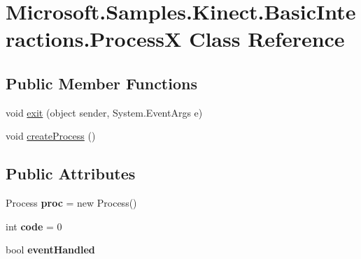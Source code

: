 \hypertarget{class_microsoft_1_1_samples_1_1_kinect_1_1_basic_interactions_1_1_process_x}{\section{Microsoft.\-Samples.\-Kinect.\-Basic\-Interactions.\-Process\-X Class Reference}
\label{class_microsoft_1_1_samples_1_1_kinect_1_1_basic_interactions_1_1_process_x}
}
\subsection*{Public Member Functions}
\begin{DoxyCompactItemize}
\item 
void \hyperlink{class_microsoft_1_1_samples_1_1_kinect_1_1_basic_interactions_1_1_process_x_afa1fa49c7b1ed3d773ddf8d4c58a8d80}{exit} (object sender, System.\-Event\-Args e)
\item 
void \hyperlink{class_microsoft_1_1_samples_1_1_kinect_1_1_basic_interactions_1_1_process_x_a1cda77c8cd9fc13f1d537dc61bca8fe6}{create\-Process} ()
\end{DoxyCompactItemize}
\subsection*{Public Attributes}
\begin{DoxyCompactItemize}
\item 
\hypertarget{class_microsoft_1_1_samples_1_1_kinect_1_1_basic_interactions_1_1_process_x_a4009d8cbd4592de6fa4512ef00115557}{Process {\bfseries proc} = new Process()}\label{class_microsoft_1_1_samples_1_1_kinect_1_1_basic_interactions_1_1_process_x_a4009d8cbd4592de6fa4512ef00115557}

\item 
\hypertarget{class_microsoft_1_1_samples_1_1_kinect_1_1_basic_interactions_1_1_process_x_af998ff5a8e7f4f70557c800501e76eb5}{int {\bfseries code} = 0}\label{class_microsoft_1_1_samples_1_1_kinect_1_1_basic_interactions_1_1_process_x_af998ff5a8e7f4f70557c800501e76eb5}

\item 
\hypertarget{class_microsoft_1_1_samples_1_1_kinect_1_1_basic_interactions_1_1_process_x_aee4d0491f5c53cdb6a70255538e316c8}{bool {\bfseries event\-Handled}}\label{class_microsoft_1_1_samples_1_1_kinect_1_1_basic_interactions_1_1_process_x_aee4d0491f5c53cdb6a70255538e316c8}

\end{DoxyCompactItemize}


